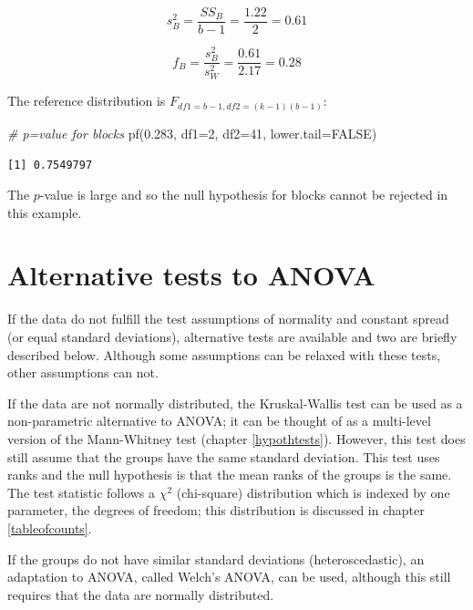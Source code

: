 \documentclass[
  oneside]{krantz}
\newenvironment{Shaded}{\begin{snugshade}}{\end{snugshade}}
\newcommand{\AttributeTok}[1]{\textcolor[rgb]{0.77,0.63,0.00}{#1}}
\newcommand{\CommentTok}[1]{\textcolor[rgb]{0.56,0.35,0.01}{\textit{#1}}}
\newcommand{\ConstantTok}[1]{\textcolor[rgb]{0.00,0.00,0.00}{#1}}
\newcommand{\DecValTok}[1]{\textcolor[rgb]{0.00,0.00,0.81}{#1}}
\newcommand{\FloatTok}[1]{\textcolor[rgb]{0.00,0.00,0.81}{#1}}
\newcommand{\FunctionTok}[1]{\textcolor[rgb]{0.00,0.00,0.00}{#1}}
\newcommand{\NormalTok}[1]{#1}
\begin{document}
\[s_B^2 = \frac{SS_B}{b-1} = \frac{1.22}{2} = 0.61\]

\[f_B = \frac{s_B^2}{s_W^2} = \frac{0.61}{2.17}  = 0.28\]

The reference distribution is \(F_{df1=b-1, df2=(k-1)(b-1)}\):

\begin{Shaded}
\begin{Highlighting}[]
\CommentTok{\# p=value for blocks}
\FunctionTok{pf}\NormalTok{(}\FloatTok{0.283}\NormalTok{, }\AttributeTok{df1=}\DecValTok{2}\NormalTok{, }\AttributeTok{df2=}\DecValTok{41}\NormalTok{, }\AttributeTok{lower.tail=}\ConstantTok{FALSE}\NormalTok{)}
\end{Highlighting}
\end{Shaded}

\begin{verbatim}
[1] 0.7549797
\end{verbatim}

The \(p\)-value is large and so the null hypothesis for blocks cannot be rejected in this example.

\hypertarget{alternative-tests-to-anova}{%
\section{Alternative tests to ANOVA}\label{alternative-tests-to-anova}}

If the data do not fulfill the test assumptions of normality and constant spread (or equal standard deviations), alternative tests are available and two are briefly described below. Although some assumptions can be relaxed with these tests, other assumptions can not.

If the data are not normally distributed, the Kruskal-Wallis test can be used as a non-parametric alternative to ANOVA; it can be thought of as a multi-level version of the Mann-Whitney test (chapter \ref{hypothtests}). However, this test does still assume that the groups have the same standard deviation. This test uses ranks and the null hypothesis is that the mean ranks of the groups is the same. The test statistic follows a \(\chi^2\) (chi-square) distribution which is indexed by one parameter, the degrees of freedom; this distribution is discussed in chapter \ref{tableofcounts}.

If the groups do not have similar standard deviations (heteroscedastic), an adaptation to ANOVA, called Welch's ANOVA, can be used, although this still requires that the data are normally distributed.
\end{document}
